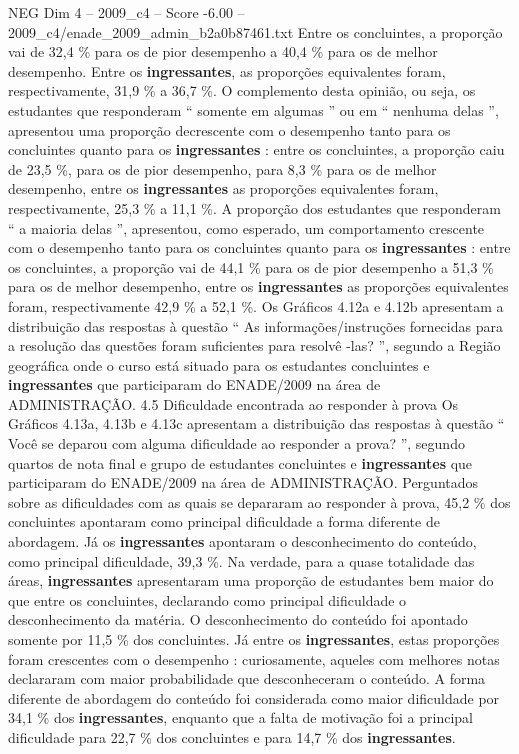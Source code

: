 \begin{textsample}{NEG Dim 4 – 2009\_c4 – Score -6.00 – 2009\_c4/enade\_2009\_admin\_b2a0b87461.txt}
Entre os concluintes, a proporção vai de 32,4 \% para os de pior desempenho a 40,4 \% para os de melhor desempenho.
Entre os \textbf{ingressantes}, as proporções equivalentes foram, respectivamente, 31,9 \% a 36,7 \%.
O complemento desta opinião, ou seja, os estudantes que responderam “ somente em algumas ” ou em “ nenhuma delas ”, apresentou uma proporção decrescente com o desempenho tanto para os concluintes quanto para os \textbf{ingressantes} : entre os concluintes, a proporção caiu de 23,5 \%, para os de pior desempenho, para 8,3 \% para os de melhor desempenho, entre os \textbf{ingressantes} as proporções equivalentes foram, respectivamente, 25,3 \% a 11,1 \%.
A proporção dos estudantes que responderam “ a maioria delas ”, apresentou, como esperado, um comportamento crescente com o desempenho tanto para os concluintes quanto para os \textbf{ingressantes} : entre os concluintes, a proporção vai de 44,1 \% para os de pior desempenho a 51,3 \% para os de melhor desempenho, entre os \textbf{ingressantes} as proporções equivalentes foram, respectivamente 42,9 \% a 52,1 \%.
Os Gráficos 4.12a e 4.12b apresentam a distribuição das respostas à questão “ As informações/instruções fornecidas para a resolução das questões foram suficientes para resolvê -las? ”, segundo a Região geográfica onde o curso está situado para os estudantes concluintes e \textbf{ingressantes} que participaram do ENADE/2009 na área de ADMINISTRAÇÃO. 4.5 Dificuldade encontrada ao responder à prova Os Gráficos 4.13a, 4.13b e 4.13c apresentam a distribuição das respostas à questão “ Você se deparou com alguma dificuldade ao responder a prova? ”, segundo quartos de nota final e grupo de estudantes concluintes e \textbf{ingressantes} que participaram do ENADE/2009 na área de ADMINISTRAÇÃO.
Perguntados sobre as dificuldades com as quais se depararam ao responder à prova, 45,2 \% dos concluintes apontaram como principal dificuldade a forma diferente de abordagem.
Já os \textbf{ingressantes} apontaram o desconhecimento do conteúdo, como principal dificuldade, 39,3 \%.
Na verdade, para a quase totalidade das áreas, \textbf{ingressantes} apresentaram uma proporção de estudantes bem maior do que entre os concluintes, declarando como principal dificuldade o desconhecimento da matéria.
O desconhecimento do conteúdo foi apontado somente por 11,5 \% dos concluintes.
Já entre os \textbf{ingressantes}, estas proporções foram crescentes com o desempenho : curiosamente, aqueles com melhores notas declararam com maior probabilidade que desconheceram o conteúdo.
A forma diferente de abordagem do conteúdo foi considerada como maior dificuldade por 34,1 \% dos \textbf{ingressantes}, enquanto que a falta de motivação foi a principal dificuldade para 22,7 \% dos concluintes e para 14,7 \% dos \textbf{ingressantes}.

\end{textsample}
